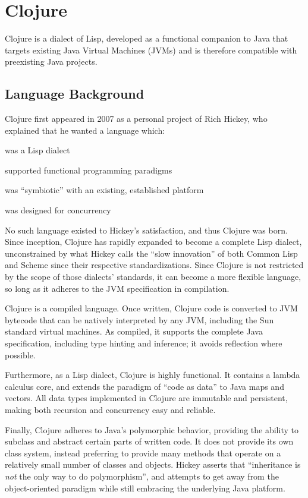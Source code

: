 \section{Clojure}

Clojure is a dialect of Lisp, developed as a functional companion to Java that targets existing Java Virtual Machines (JVMs) and is therefore compatible with preexisting Java projects. 

\subsection{Language Background}

Clojure first appeared in 2007 as a personal project of Rich Hickey, who explained that he wanted a language which:

\begin{itemize*}
\item was a Lisp dialect
\item supported functional programming paradigms
\item was ``symbiotic'' with an existing, established platform
\item was designed for concurrency
\end{itemize*}

No such language existed to Hickey's satisfaction, and thus Clojure was born. Since inception, Clojure has rapidly expanded to become a complete Lisp dialect, unconstrained by what Hickey calls the ``slow innovation''\cite{clojurerationale} of both Common Lisp and Scheme since their respective standardizations. Since Clojure is not restricted by the scope of those dialects' standards, it can become a more flexible language, so long as it adheres to the JVM specification in compilation.

Clojure is a compiled language. Once written, Clojure code is converted to JVM bytecode that can be natively interpreted by any JVM, including the Sun standard virtual machines. As compiled, it supports the complete Java specification, including type hinting and inference; it avoids reflection where possible.

Furthermore, as a Lisp dialect, Clojure is highly functional. It contains a lambda calculus core, and extends the paradigm of ``code as data'' to Java maps and vectors. All data types implemented in Clojure are immutable and persistent, making both recursion and concurrency easy and reliable.

Finally, Clojure adheres to Java's polymorphic behavior, providing the ability to subclass and abstract certain parts of written code. It does not provide its own class system, instead preferring to provide many methods that operate on a relatively small number of classes and objects. Hickey asserts that ``inheritance is \textit{not} the only way to do polymorphism''\cite{clojurerationale}, and attempts to get away from the object-oriented paradigm while still embracing the underlying Java platform.

